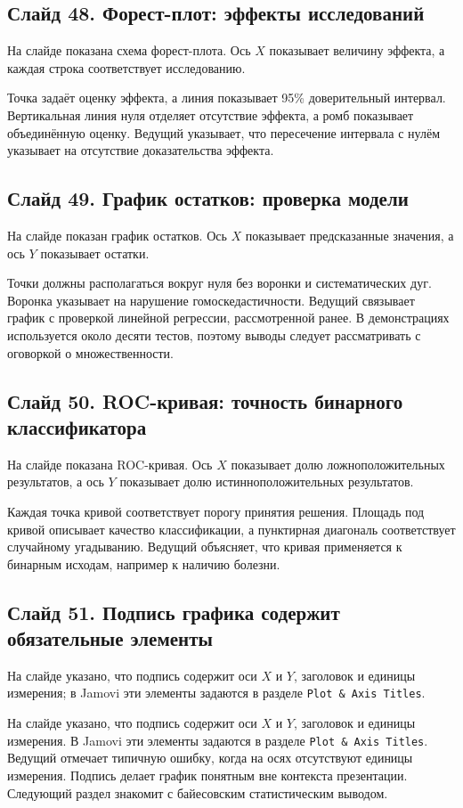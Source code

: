 \documentclass[11pt,a4paper]{article}
\begin{document}
\subsection*{Слайд 48. Форест-плот: эффекты исследований}
\begin{onslide}
На слайде показана схема форест-плота. Ось $X$ показывает величину эффекта, а каждая строка соответствует исследованию.
\end{onslide}
Точка задаёт оценку эффекта, а линия показывает 95\% доверительный интервал. Вертикальная линия нуля отделяет отсутствие эффекта, а ромб показывает объединённую оценку. Ведущий указывает, что пересечение интервала с нулём указывает на отсутствие доказательства эффекта.

\subsection*{Слайд 49. График остатков: проверка модели}
\begin{onslide}
На слайде показан график остатков. Ось $X$ показывает предсказанные значения, а ось $Y$ показывает остатки.
\end{onslide}
Точки должны располагаться вокруг нуля без воронки и систематических дуг. Воронка указывает на нарушение гомоскедастичности. Ведущий связывает график с проверкой линейной регрессии, рассмотренной ранее. В демонстрациях используется около десяти тестов, поэтому выводы следует рассматривать с оговоркой о множественности.

\subsection*{Слайд 50. ROC-кривая: точность бинарного классификатора}
\begin{onslide}
На слайде показана ROC-кривая. Ось $X$ показывает долю ложноположительных результатов, а ось $Y$ показывает долю истинноположительных результатов.
\end{onslide}
Каждая точка кривой соответствует порогу принятия решения. Площадь под кривой описывает качество классификации, а пунктирная диагональ соответствует случайному угадыванию. Ведущий объясняет, что кривая применяется к бинарным исходам, например к наличию болезни.

\subsection*{Слайд 51. Подпись графика содержит обязательные элементы}
\begin{onslide}
На слайде указано, что подпись содержит оси $X$ и $Y$, заголовок и единицы измерения; в Jamovi эти элементы задаются в разделе \texttt{Plot \& Axis Titles}.
\end{onslide}
На слайде указано, что подпись содержит оси $X$ и $Y$, заголовок и единицы измерения. В Jamovi эти элементы задаются в разделе \texttt{Plot \& Axis Titles}. Ведущий отмечает типичную ошибку, когда на осях отсутствуют единицы измерения. Подпись делает график понятным вне контекста презентации. Следующий раздел знакомит с байесовским статистическим выводом.
\end{document}
